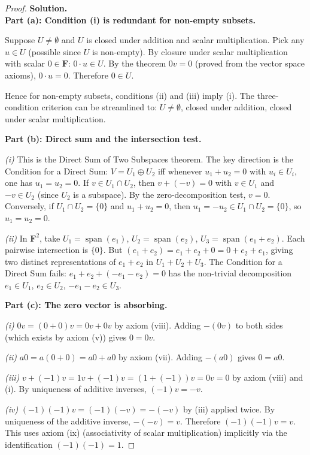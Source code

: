 \begin{proof}
\textbf{Solution.}~\\

\textbf{Part (a): Condition (i) is redundant for non-empty subsets.}

Suppose $U \neq \emptyset$ and $U$ is closed under addition and scalar
multiplication. Pick any $u \in U$ (possible since $U$ is non-empty). By
closure under scalar multiplication with scalar $0 \in \mathbf{F}$:
$0 \cdot u \in U$. By the theorem $0v = 0$ (proved from the vector space
axioms), $0 \cdot u = 0$. Therefore $0 \in U$.

Hence for non-empty subsets, conditions (ii) and (iii) imply (i). The
three-condition criterion can be streamlined to: $U \neq \emptyset$,
closed under addition, closed under scalar multiplication.

\medskip
\textbf{Part (b): Direct sum and the intersection test.}

\textit{(i)} This is the Direct Sum of Two Subspaces theorem. The key
direction is the Condition for a Direct Sum: $V = U_1 \oplus U_2$ iff
whenever $u_1 + u_2 = 0$ with $u_i \in U_i$, one has $u_1 = u_2 = 0$.
If $v \in U_1 \cap U_2$, then $v + (-v) = 0$ with $v \in U_1$ and
$-v \in U_2$ (since $U_2$ is a subspace). By the zero-decomposition test,
$v = 0$. Conversely, if $U_1 \cap U_2 = \{0\}$ and $u_1 + u_2 = 0$,
then $u_1 = -u_2 \in U_1 \cap U_2 = \{0\}$, so $u_1 = u_2 = 0$.

\textit{(ii)} In $\mathbf{F}^2$, take $U_1 = \operatorname{span}(e_1)$,
$U_2 = \operatorname{span}(e_2)$, $U_3 = \operatorname{span}(e_1 + e_2)$.
Each pairwise intersection is $\{0\}$. But $(e_1 + e_2) = e_1 + e_2 + 0 =
0 + e_2 + e_1$, giving two distinct representations of $e_1 + e_2$ in
$U_1 + U_2 + U_3$. The Condition for a Direct Sum fails: $e_1 + e_2 +
(-e_1 - e_2) = 0$ has the non-trivial decomposition $e_1 \in U_1$,
$e_2 \in U_2$, $-e_1 - e_2 \in U_3$.

\medskip
\textbf{Part (c): The zero vector is absorbing.}

\textit{(i)} $0v = (0+0)v = 0v + 0v$ by axiom (viii). Adding $-(0v)$ to
both sides (which exists by axiom (v)) gives $0 = 0v$.

\textit{(ii)} $a0 = a(0+0) = a0 + a0$ by axiom (vii). Adding $-(a0)$ gives
$0 = a0$.

\textit{(iii)} $v + (-1)v = 1v + (-1)v = (1 + (-1))v = 0v = 0$ by axiom
(viii) and (i). By uniqueness of additive inverses, $(-1)v = -v$.

\textit{(iv)} $(-1)(-1)v = (-1)(-v) = -(-v)$ by (iii) applied twice. By
uniqueness of the additive inverse, $-(-v) = v$. Therefore $(-1)(-1)v = v$.
This uses axiom (ix) (associativity of scalar multiplication) implicitly
via the identification $(-1)(-1) = 1$.


\end{proof}
